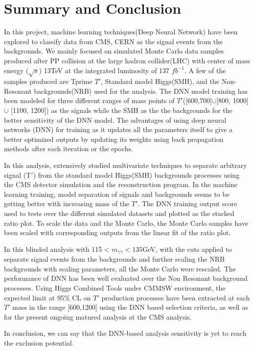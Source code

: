 \chapter{\label{summary}Summary and Conclusion}
In this project, machine learning techniques(Deep Neural Network) have been explored to classify data from CMS, CERN as the signal events from the backgrounds. We mainly focused on simulated Monte Carlo data samples produced after PP collision at the large hadron collider(LHC) with center of mass energy ($\sqrt{s}$) 13TeV at the integrated luminosity of 137 $fb^{-1}$. A few of the samples produced are Tprime $T'$, Standard model Higgs(SMH), and the Non-Resonant backgrounds(NRB) used for the analysis. The DNN model training has been modeled for three different ranges of mass points of $T'$([600,700]$\cup$[800, 1000]$\cup$ [1100, 1200]) as the signals while the SMH as the the backgrounds for the better sensitivity of the DNN model. The advantages of using deep neural networks (DNN) for training  as it updates all the parameters itself to give a better optimized outputs by updating its weights using back propagation methods after each iteration or the epochs.

In this analysis, extensively studied multivariate techniques to separate arbitrary signal (T$'$) from the standard model Higgs(SMH) backgrounds processes using the CMS detector simulation and the reconstruction program. In the machine learning training, model separation of signals and backgrounds seems to be getting better with increasing mass of the $T'$.  The DNN training output score used to tests over the different simulated datasets and plotted as the stacked ratio plot. To scale the data and the Monte Carlo, the Monte Carlo samples have been scaled with corresponding outputs from the linear fit of the ratio plot.  

In this blinded analysis with 115 < $m_{\gamma\gamma}< 135$GeV, with the cuts applied to separate signal events from the backgrounds and further scaling the NRB backgrounds with scaling parameters, all the Monte Carlo were rescaled. The performance of DNN has been well evaluated over the Non Resonant background processes. Using Higgs Combined Tools under CMMSW environment, the expected limit at 95\% CL on $T'$ production processes have been extracted at each $T'$ mass in the range
[600,1200] using the DNN based selection criteria, as well as for the present ongoing matured analysis at the CMS analysis. 

In conclusion, we can say that the DNN-based analysis sensitivity is yet to reach the exclusion potential.

